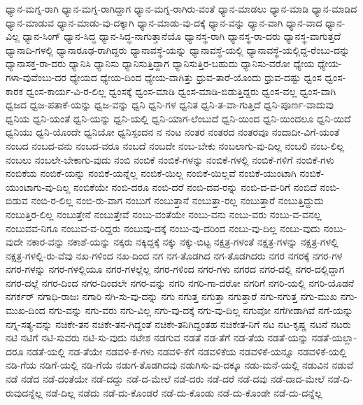 {ಧ್ಯಾನ-ಮಗ್ನ-ರಾಗಿ
ಧ್ಯಾನ-ಮಗ್ನ-ರಾಗಿದ್ದಾಗ
ಧ್ಯಾನ-ಮಗ್ನ-ರಾಗಿರು-ವಂತೆ
ಧ್ಯಾನ-ಮಾಡಲು
ಧ್ಯಾನ-ಮಾಡಿ
ಧ್ಯಾನ-ಮಾಡಿದ
ಧ್ಯಾನ-ಮಾಡುವ
ಧ್ಯಾನ-ಮಾಡು-ವು-ದಕ್ಕಾಗಿ
ಧ್ಯಾನ-ಮಾಡು-ವು-ದಕ್ಕೆ
ಧ್ಯಾನ-ವನ್ನು
ಧ್ಯಾನ-ವಾಗಿ
ಧ್ಯಾನ-ವಾದ
ಧ್ಯಾನ-ವಿಲ್ಲ
ಧ್ಯಾನ-ಸಿಂಗ್
ಧ್ಯಾನ-ಸಿದ್ಧ
ಧ್ಯಾನ-ಸಿದ್ಧ-ನಾಗುತ್ತಾನೆಯೊ
ಧ್ಯಾನಸ್ಥ-ರಾಗಿ
ಧ್ಯಾನಸ್ಥ-ರಾ-ದರು
ಧ್ಯಾನಸ್ಥ-ವಾಗುತ್ತದೆ
ಧ್ಯಾನಾದಿ-ಗಳಲ್ಲಿ
ಧ್ಯಾನಾರೂಢ-ರಾಗಿದ್ದರು
ಧ್ಯಾನಾವಸ್ಥೆ-ಯನ್ನು
ಧ್ಯಾನಾವಸ್ಥೆ-ಯಲ್ಲಿ
ಧ್ಯಾನಾವಸ್ಥೆ-ಯಲ್ಲಿದ್ದ-ರೆಂಬು-ದನ್ನು
ಧ್ಯಾನಾಸಕ್ತ-ರಾ-ದರು
ಧ್ಯಾನಿಸಿ
ಧ್ಯಾನಿಸು
ಧ್ಯಾನಿಸುತ್ತಿದ್ದಾಗ
ಧ್ಯಾನಿಸುತ್ತಿರ-ಬಹುದು
ಧ್ಯಾನಿಸು-ವರೋ
ಧ್ಯೇಯ
ಧ್ಯೇಯ-ಗಳಾ-ವುವೆಂಬು-ದರ
ಧ್ಯೇಯದ
ಧ್ಯೇಯ-ದಿಂದ
ಧ್ಯೇಯ-ವಾಗಿತ್ತು
ಧ್ರುವ-ತಾರೆ-ಯೊಂದು
ಧ್ರುವ-ದಷ್ಟು
ಧ್ವಂಸ
ಧ್ವಂಸ-ಕಾರಕ
ಧ್ವಂಸ-ಕಾರ್ಯ-ವಿ-ರ-ಲಿಲ್ಲ
ಧ್ವಂಸಕ್ಕೆ
ಧ್ವಂಸ-ಮಾಡಿ
ಧ್ವಂಸ-ಮಾಡಿ-ಬಿಡುತ್ತಿದ್ದರು
ಧ್ವಂಸ-ವಲ್ಲ
ಧ್ವಂಸ-ವಾಗಿ
ಧ್ವಜದ
ಧ್ವಜ-ಪತಾಕೆ-ಯನ್ನು
ಧ್ವಜ-ವನ್ನು
ಧ್ವನಿ
ಧ್ವನಿ-ಗಳ
ಧ್ವನಿತ
ಧ್ವನಿ-ತ-ವಾ-ಗುತ್ತಿದೆ
ಧ್ವನಿ-ಪೂರ್ಣ-ವಾದುವು
ಧ್ವನಿಯ
ಧ್ವನಿ-ಯಂತೆ
ಧ್ವನಿ-ಯನ್ನು
ಧ್ವನಿ-ಯಲ್ಲಿ
ಧ್ವನಿ-ಯಾಗ-ಲೆಂಬುದೆ
ಧ್ವನಿ-ಯಿಂದ
ಧ್ವನಿ-ಯಿಂದಲೂ
ಧ್ವನಿ-ಯಿದೆ
ಧ್ವನಿಯು
ಧ್ವನಿ-ಯೊಂದೇ
ಧ್ವನಿಯೋ
ಧ್ವನಿಸ್ಪಂದನ
ನ
ನಂಟ
ನಂತರ
ನಂತರದ
ನಂತರವೂ
ನಂದಾದೀ-ವಿಗೆ-ಯಂತೆ
ನಂಬದ
ನಂಬದ-ವನು
ನಂಬದ-ವರೂ
ನಂಬದೆ
ನಂಬದೇ
ನಂಬ-ಬೇಕು
ನಂಬಲಾಗು-ವು-ದಿಲ್ಲ
ನಂಬಲಿ
ನಂಬ-ಲಿಲ್ಲ
ನಂಬಲು
ನಂಬಲೇ-ಬೇಕಾಗು-ವುದು
ನಂಬಿ
ನಂಬಿಕೆ
ನಂಬಿಕೆ-ಗಳನ್ನು
ನಂಬಿಕೆ-ಗಳಲ್ಲಿ
ನಂಬಿಕೆ-ಗಳಿಗೆ
ನಂಬಿಕೆ-ಗಳು
ನಂಬಿಕೆಯ
ನಂಬಿಕೆ-ಯನ್ನು
ನಂಬಿಕೆ-ಯನ್ನೆಲ್ಲ
ನಂಬಿಕೆ-ಯಿಲ್ಲ
ನಂಬಿಕೆ-ಯಿಲ್ಲವೆ
ನಂಬಿಕೆ-ಯುಂಟಾಗಿ
ನಂಬಿಕೆ-ಯುಂಟಾಗು-ವು-ದಿಲ್ಲ
ನಂಬಿಕೆಯೇ
ನಂಬಿ-ದರೂ
ನಂಬಿ-ದರೆ
ನಂಬಿ-ದವ-ರನ್ನು
ನಂಬಿ-ದ-ವ-ರಿಗೆ
ನಂಬಿದೆ
ನಂಬಿ-ಬಿಡುವ
ನಂಬಿ-ರ-ಲಿಲ್ಲ
ನಂಬಿ-ರು-ವಾಗ
ನಂಬುಗೆ
ನಂಬುತ್ತಾನೆ
ನಂಬುತ್ತಾ-ರಲ್ಲ
ನಂಬುತ್ತಾರೆ
ನಂಬುತ್ತಿದ್ದುದು
ನಂಬುತ್ತಿರ-ಲಿಲ್ಲ
ನಂಬುತ್ತೇನೆ
ನಂಬುತ್ತೇವೆ
ನಂಬು-ವಂತೆಯೇ
ನಂಬು-ವನು
ನಂಬು-ವರು
ನಂಬು-ವ-ವನಲ್ಲ
ನಂಬುವವ-ನಿಗೂ
ನಂಬುವ-ವ-ರಿದ್ದರು
ನಂಬುವು-ದಕ್ಕೆ
ನಂಬು-ವು-ದರಿಂದ
ನಂಬು-ವು-ದಿಲ್ಲ
ನಂಬು-ವುದು
ನಂಬು-ವುದೇ
ನಕಾರ-ವನ್ನು
ನಕಾಶೆ-ಯನ್ನು
ನಕ್ಕರು
ನಕ್ಕಿದ್ದಕ್ಕೆ
ನಕ್ಕು
ನಕ್ಕು-ಬಿಟ್ಟ
ನಕ್ಷತ್ರ-ಗಳಂತೆ
ನಕ್ಷತ್ರ-ಗಳನ್ನು
ನಕ್ಷತ್ರ-ಗಳಲ್ಲಿ
ನಕ್ಷತ್ರ-ಗಳಲ್ಲಿ-ರು-ವೆವು
ನಖ-ಗಳಿಂದ
ನಖ-ದಿಂದ
ನಗ
ನಗ-ತೊಡಗಿದ
ನಗ-ತೊಡಗಿದರು
ನಗರ
ನಗರಕ್ಕೆ
ನಗರ-ಗಳ
ನಗರ-ಗಳನ್ನು
ನಗರ-ಗಳಲ್ಲಿಯೂ
ನಗರ-ಗಳಲ್ಲೆಲ್ಲ
ನಗರ-ಗಳಿಂದ
ನಗರ-ಗಳು
ನಗರದ
ನಗರ-ದಲ್ಲಿ
ನಗರ-ದಲ್ಲಿದ್ದಾಗ
ನಗರ-ದಲ್ಲೆ
ನಗರ-ದಿಂದ
ನಗರ-ದಿಂದಲೇ
ನಗರ-ವನ್ನು
ನಗರಿ
ನಗರಿ-ಗಾ-ದರೋ
ನಗರಿಗೆ
ನಗರಿ-ಯಲ್ಲಿ
ನಗರಿ-ಯೊಡನೆ
ನಗರ್ಕರ್
ನಗಾಧಿ-ರಾಜಃ
ನಗಾರಿ
ನಗಿ-ಸು-ವು-ದನ್ನು
ನಗು
ನಗುತ್ತ
ನಗುತ್ತಾ
ನಗುತ್ತಾರೆ
ನಗು-ನಗುತ್ತ
ನಗು-ಮುಖ
ನಗು-ಮುಖ-ದಿಂದ
ನಗು-ವನ್ನು
ನಗು-ವರು
ನಗು-ವಿಲ್ಲ
ನಗು-ವು-ದಕ್ಕೆ
ನಗು-ವು-ದಿಲ್ಲ
ನಗುವೋ
ನಗೆಗೀಡಾಗಿವೆ
ನಗೆ-ಯನ್ನು
ನಗ್ನ-ಸತ್ಯ-ವನ್ನು
ನಚಿಕೇ-ತನ
ನಚಿಕೇ-ತನ-ಗಿದ್ದಂತೆ
ನಚಿಕೇ-ತನಿಗಿದ್ದಂತಹ
ನಚಿಕೇತ-ನಿಗೆ
ನಟ
ನಟ-ಕೃಷ್ಣ
ನಟನೆ
ನಟರು
ನಟಿ
ನಟಿಗೆ
ನಟಿ-ಸುವರು
ನಟಿ-ಸು-ವುದು
ನಟೇಶ
ನಡಗುವ
ನಡತೆ
ನಡ-ತೆಗೆ
ನಡ-ತೆಯ
ನಡತೆ-ಯನ್ನು
ನಡತೆ-ಯಲ್ಲಾ-ದರೂ
ನಡತೆ-ಯಲ್ಲಿ
ನಡ-ತೆಯೇ
ನಡವಳಿ-ಕೆ-ಗಳು
ನಡವಳಿ-ಕೆಗೆ
ನಡವಳಿಕೆಯ
ನಡವಳಿಕೆ-ಯನ್ನೂ
ನಡವಳಿಕೆ-ಯಲ್ಲಿ
ನಡಿ-ಗೆಯ
ನಡಿಗೆ-ಯಲ್ಲಿ
ನಡಿ-ಗೆಯೆ
ನಡುಗ-ತೊಡಗಿದವು
ನಡುಗಿಸು-ವು-ದಕ್ಕೂ
ನಡು-ಮನೆ-ಯಲ್ಲಿ
ನಡುವಿನ
ನಡುವೆ
ನಡೆ
ನಡೆದ
ನಡೆ-ದಂತೆಯೇ
ನಡೆ-ದದ್ದು
ನಡೆ-ದ-ಮೇಲೆ
ನಡೆ-ದರು
ನಡೆ-ದರೆ
ನಡೆ-ದವು
ನಡೆ-ದಾದ-ಮೇಲೆ
ನಡೆ-ದಿ-ರುವುದನ್ನೆಲ್ಲ
ನಡೆ-ದಿಲ್ಲ
ನಡೆದು
ನಡೆ-ದು-ಕೊಂಡರೆ
ನಡೆ-ದು-ಕೊಂಡು
ನಡೆ-ದು-ಕೊಂಡೇ
ನಡೆ-ದು-ದನ್ನೆಲ್ಲ
}
